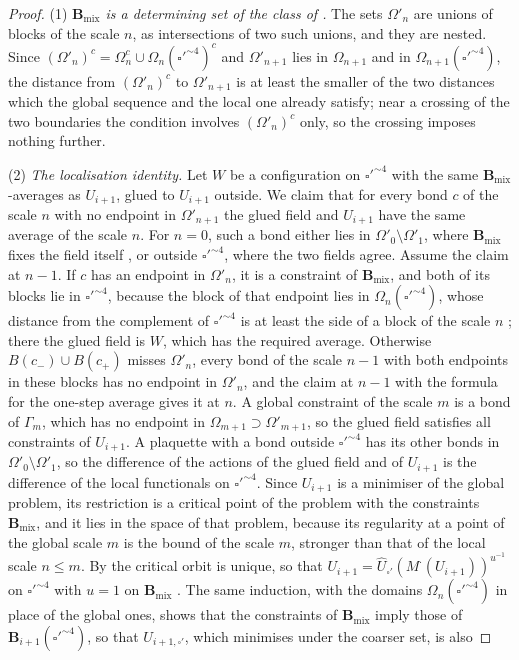 \documentclass[11pt]{preprint}
\numberwithin{equation}{section}
\theoremstyle{definition}
\theoremstyle{remark}
\theoremstyle{plain}
\begin{document}
\begin{proof}
(1) \emph{$\mathbf B_{\mathrm{mix}}$ is a determining set of the class of \cite[(1), p.~277]{BalabanVAR}.} The sets $\Omega'_n$ are unions of blocks of the scale $n$, as intersections of two such unions, and they are nested. Since $(\Omega'_n)^c = \Omega_n^c \cup \Omega_n(\square'^{\sim4})^c$ and $\Omega'_{n+1}$ lies in $\Omega_{n+1}$ and in $\Omega_{n+1}(\square'^{\sim4})$, the distance from $(\Omega'_n)^c$ to $\Omega'_{n+1}$ is at least the smaller of the two distances which the global sequence and the local one already satisfy; near a crossing of the two boundaries the condition involves $(\Omega'_n)^c$ only, so the crossing imposes nothing further.

(2) \emph{The localisation identity.} Let $W$ be a configuration on $\square'^{\sim4}$ with the same $\mathbf B_{\mathrm{mix}}$-averages as $U_{i+1}$, glued to $U_{i+1}$ outside. We claim that for every bond $c$ of the scale $n$ with no endpoint in $\Omega'_{n+1}$ the glued field and $U_{i+1}$ have the same average of the scale $n$. For $n = 0$, such a bond either lies in $\Omega'_0 \setminus \Omega'_1$, where $\mathbf B_{\mathrm{mix}}$ fixes the field itself \cite[(3), p.~277]{BalabanVAR}, or outside $\square'^{\sim4}$, where the two fields agree. Assume the claim at $n - 1$. If $c$ has an endpoint in $\Omega'_n$, it is a constraint of $\mathbf B_{\mathrm{mix}}$, and both of its blocks lie in $\square'^{\sim4}$, because the block of that endpoint lies in $\Omega_n(\square'^{\sim4})$, whose distance from the complement of $\square'^{\sim4}$ is at least the side of a block of the scale $n$ \cite[p.~256]{BalabanCRE}; there the glued field is $W$, which has the required average. Otherwise $B(c_-) \cup B(c_+)$ misses $\Omega'_n$, every bond of the scale $n - 1$ with both endpoints in these blocks has no endpoint in $\Omega'_n$, and the claim at $n - 1$ with the formula \cite[(0.4), p.~253]{BalabanRG1} for the one-step average gives it at $n$. A global constraint of the scale $m$ is a bond of $\Gamma_m$, which has no endpoint in $\Omega_{m+1} \supset \Omega'_{m+1}$, so the glued field satisfies all constraints of $U_{i+1}$. A plaquette with a bond outside $\square'^{\sim4}$ has its other bonds in $\Omega'_0 \setminus \Omega'_1$, so the difference of the actions of the glued field and of $U_{i+1}$ is the difference of the local functionals \cite[(5), p.~277]{BalabanVAR} on $\square'^{\sim4}$. Since $U_{i+1}$ is a minimiser of the global problem, its restriction is a critical point of the problem with the constraints $\mathbf B_{\mathrm{mix}}$, and it lies in the space \cite[(6), p.~278]{BalabanVAR} of that problem, because its regularity at a point of the global scale $m$ is the bound of the scale $m$, stronger than that of the local scale $n \leq m$. By \cite[Theorem~1, p.~279]{BalabanVAR} the critical orbit is unique, so that $U_{i+1} = \hat U_{\square'}(M^\cdot(U_{i+1}))^{u^{-1}}$ on $\square'^{\sim4}$ with $u = 1$ on $\mathbf B_{\mathrm{mix}}$ \cite[(4), p.~277]{BalabanVAR}. The same induction, with the domains $\Omega_n(\square'^{\sim4})$ in place of the global ones, shows that the constraints of $\mathbf B_{\mathrm{mix}}$ imply those of $\mathbf B_{i+1}(\square'^{\sim4})$, so that $U_{i+1,\square'}$, which minimises under the coarser set, is also 
\end{proof}
\end{document}
